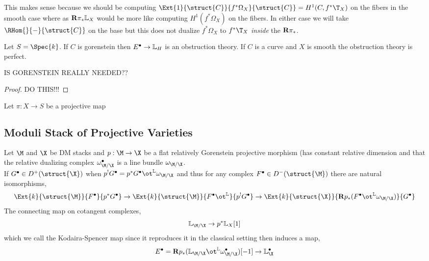 \documentclass[12pt]{article}
\begin{document}
\begin{rmk}
This makes sense because we should be computing $\Ext{1}{\struct{C}}{f^* \Omega_X}{\struct{C}} = H^1(C, f^* \T_X)$ on the fibers in the smooth case where as $\mathbf{R} \pi_* \mathbb{L}_{X}$ would be more like computing $H^1(f^* \Omega_X)$ on the fibers. In either case we will take $\RHom{}{-}{\struct{C}}$ on the base but this does not dualize $f^* \Omega_X$ to $f^* \T_X$ \textit{inside} the $\mathbf{R} \pi_*$.
\end{rmk}

\begin{theorem}
Let $S = \Spec{k}$. If $C$ is gorenstein then $E^\bullet \to \mathbb{L}_{H}$ is an obstruction theory. If $C$ is a curve and $X$ is smooth the obstruction theory is perfect.
\end{theorem}

\begin{rmk}
IS GORENSTEIN REALLY NEEDED??
\end{rmk}

\begin{proof}
DO THIS!!!
\end{proof}

\begin{lemma}
Let $\pi : X \to S$ be a projective map 
\end{lemma}

\subsection{Moduli Stack of Projective Varieties}

Let $\M$ and $\X$ be DM stacks and $p : \M \to \X$ be a flat relatively Gorenstein projective morphism (has constant relative dimension and that the relative dualizing complex $\omega_{\M/\X}^{\bullet}$ is a line bundle $\omega_{\M/\X}$. 
\bigskip\\
If $G^\bullet \in D^+(\struct{\X})$ when $p^! G^\bullet = p^* G^\bullet \ot^{\LL} \omega_{\M/\X}$ and thus for any complex $F^\bullet \in D^{-}(\struct{\M})$ there are natural isomorphisms,
\[ \Ext{k}{\struct{\M}}{F^\bullet}{p^* G^\bullet} \to \Ext{k}{\struct{\M}}{F^\bullet \ot^{\LL}}{p^! G^\bullet} \to \Ext{k}{\struct{\X}}{ \R p_* (F^\bullet \ot^{\LL} \omega_{\M/\X})}{G^\bullet} \]
The connecting map on cotangent complexes,
\[ \LL_{\M/\X} \to p^* \LL_{X}[1] \]
which we call the Kodaira-Spencer map since it reproduces it in the classical setting then induces a map,
\[ E^\bullet = \R p_* (\LL_{\M/\X} \ot^{\LL} \omega_{\M/\X}^\bullet)[-1] \to \LL_{\X}^\bullet \]
\end{document}
